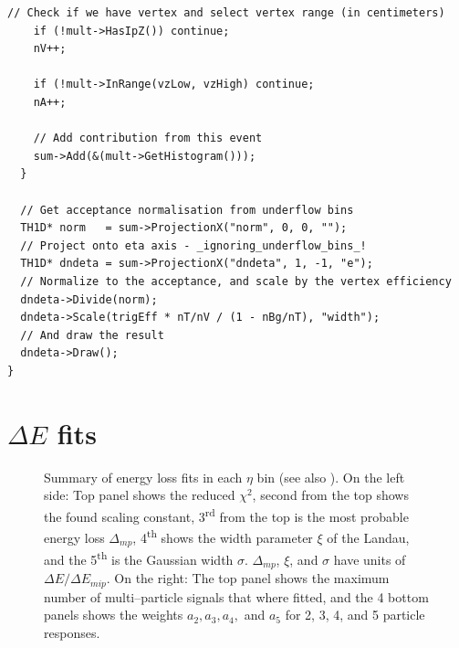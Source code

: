 \documentclass[11pt]{article}
\begin{document}
\begin{lstlisting}[caption={Example 2\textsuperscript{nd} pass code to
    do $\dndeta$},label={lst:example},frame=single,captionpos=b]
    // Check if we have vertex and select vertex range (in centimeters) 
    if (!mult->HasIpZ()) continue;
    nV++;
    
    if (!mult->InRange(vzLow, vzHigh) continue; 
    nA++;

    // Add contribution from this event
    sum->Add(&(mult->GetHistogram()));
  }

  // Get acceptance normalisation from underflow bins 
  TH1D* norm   = sum->ProjectionX("norm", 0, 0, "");
  // Project onto eta axis - _ignoring_underflow_bins_!
  TH1D* dndeta = sum->ProjectionX("dndeta", 1, -1, "e");
  // Normalize to the acceptance, and scale by the vertex efficiency 
  dndeta->Divide(norm);
  dndeta->Scale(trigEff * nT/nV / (1 - nBg/nT), "width");
  // And draw the result
  dndeta->Draw();
}
\end{lstlisting}

\section{$\Delta E$ fits} 
\label{app:eloss_fits}

\begin{figure}[htbp]
  \centering
  \caption{Summary of energy loss fits in each $\eta$ bin (see also
    ).
    \newline
    On the left side: Top panel shows the
    reduced $\chi^2$, second from the top shows the found
    scaling constant, 3\textsuperscript{rd} from the top is
    the most probable energy loss $\Delta_{mp}$, 4\textsuperscript{th}
    shows the width parameter $\xi$ of the Landau, and the
    5\textsuperscript{th} is the Gaussian width $\sigma$.
    $\Delta_{mp}$, $\xi$, and $\sigma$ have units of $\Delta E/\Delta
    E_{mip}$. 
    \newline
    On the right: The top panel shows the maximum number of
    multi--particle signals that where fitted, and the 4 bottom panels
    shows the weights $a_2,a_3,a_4,$ and $a_5$ for 2, 3, 4, and 5
    particle responses.}
  \label{fig:eloss_fits}
\end{figure}
\end{document}
